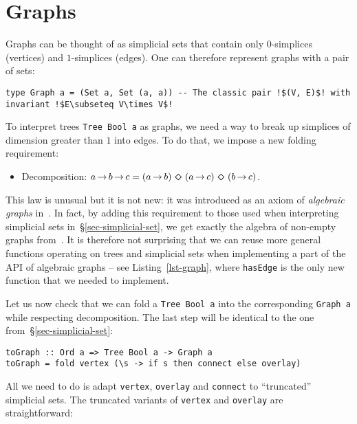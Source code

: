 \documentclass[crc,english]{programming}
\newcommand{\hcode}[1]{{\color{darkblue} \lstinline[keywordstyle={}]|#1|}} %
\newcommand{\dia}{\,\text{\raisebox{-0.3mm}{\Large $\diamond$}}\,}
\newcommand{\arr}{\,\text{$\rightarrow$}\,}
\begin{document}
\vspace{-2mm}
\section{Graphs}\label{sec-graph}

Graphs can be thought of as simplicial sets that contain only $0$-simplices
(vertices) and $1$-simplices (edges). One can therefore represent graphs with a
pair of sets:

\begin{lstlisting}
type Graph a = (Set a, Set (a, a)) -- The classic pair !$(V, E)$! with invariant !$E\subseteq V\times V$!
\end{lstlisting}

\noindent
To interpret trees \hcode{Tree Bool a} as graphs, we need a way to break up
simplices of dimension greater than $1$ into edges. To do that, we impose a new
folding requirement:

\begin{itemize}
    \item Decomposition:
          $a \arr b \arr c = (a \arr b)\,\dia\,(a \arr c)\,\dia\,(b \arr c)$.
\end{itemize}

\noindent
This law is unusual but it is not new: it was introduced as an axiom of
\emph{algebraic graphs} in~\cite{mokhov_alga}. In fact, by adding this
requirement to those used when interpreting simplicial sets
in~\S\ref{sec-simplicial-set}, we get exactly the algebra of non-empty graphs
from~\cite{mokhov_alga}. It is therefore not surprising that we can reuse more
general functions operating on trees and simplicial sets when implementing a
part of the API of algebraic graphs -- see Listing~\ref{lst-graph}, where
\hcode{hasEdge} is the only new function that we needed to implement.

Let us now check that we can fold a \hcode{Tree Bool a} into the corresponding
\hcode{Graph a} while respecting decomposition. The last step will be identical
to the one from~\S\ref{sec-simplicial-set}:

\begin{lstlisting}
toGraph :: Ord a => Tree Bool a -> Graph a
toGraph = fold vertex (\s -> if s then connect else overlay)
\end{lstlisting}

\noindent
All we need to do is adapt \hcode{vertex}, \hcode{overlay} and \hcode{connect}
to ``truncated'' simplicial sets. The truncated variants of \hcode{vertex} and
\hcode{overlay} are straightforward:
\end{document}
